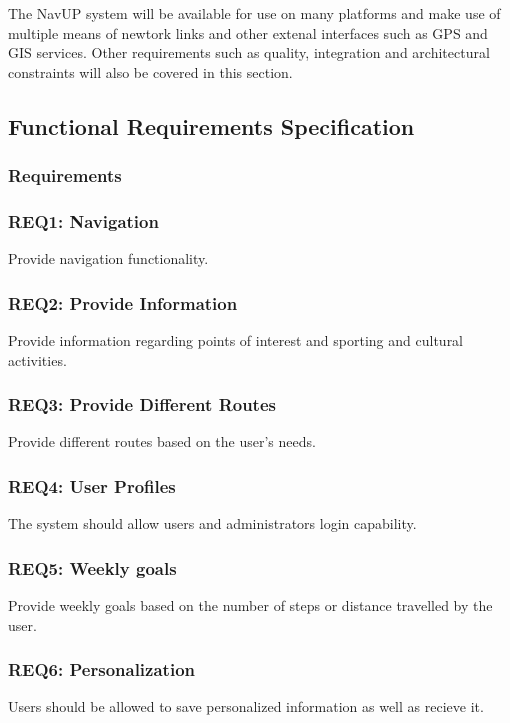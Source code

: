 \documentclass[11pt, a4paper]{article}
\begin{document}
		The NavUP system will be available for use on many platforms and make use of multiple means of newtork links and other extenal interfaces such as GPS and GIS services.
		Other requirements such as quality,  integration and architectural constraints will also be covered in this section.
		
	\subsection{Functional Requirements Specification}
	\subsubsection{Requirements}
		
		\subsubsection {REQ1: Navigation}
			Provide navigation functionality.
			
		\subsubsection {REQ2: Provide Information}
			Provide information regarding points of interest and sporting and cultural activities.
			
		\subsubsection{REQ3: Provide Different Routes}
			Provide different routes based on the user's needs.
		
		\subsubsection{REQ4: User Profiles}
			The system should allow users and administrators login capability.
			
		\subsubsection{REQ5: Weekly goals}
			Provide weekly goals based on the number of steps or distance travelled by the user.
			
		\subsubsection{REQ6: Personalization}
			Users should be allowed to save personalized information as well as recieve it.
			
\end{document}
